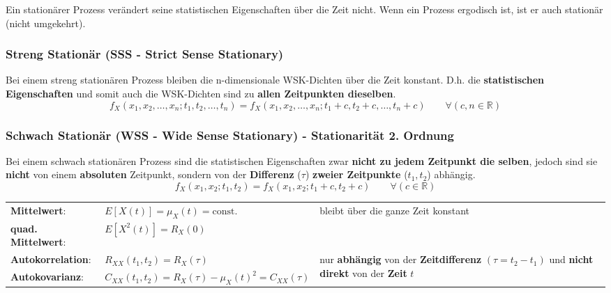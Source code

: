 Ein stationärer Prozess verändert seine statistischen Eigenschaften über die
Zeit nicht. Wenn ein Prozess ergodisch ist, ist er auch stationär (nicht
umgekehrt).\\

\subsubsection{Streng Stationär (SSS - Strict Sense Stationary)}
Bei einem streng stationären Prozess bleiben die n-dimensionale WSK-Dichten über die
Zeit konstant. D.h. die \textbf{statistischen Eigenschaften} und somit auch die WSK-Dichten sind zu 
\textbf{allen Zeitpunkten dieselben}.
$$ f_X(x_1, x_2, \ldots, x_n; t_1, t_2, \ldots, t_n) =
		f_X(x_1, x_2, \ldots, x_n; t_1+c, t_2+c, \ldots, t_n+c) \qquad \forall (c,n \in
		\mathbb{R})$$

\subsubsection{Schwach Stationär (WSS - Wide Sense Stationary) - Stationarität 2. Ordnung}
Bei einem schwach stationären Prozess sind die statistischen Eigenschaften zwar
\textbf{nicht zu jedem Zeitpunkt die selben}, jedoch sind sie \textbf{nicht} von einem \textbf{absoluten} Zeitpunkt, sondern
von der \textbf{Differenz} ($\tau$) \textbf{zweier Zeitpunkte} ($t_1, t_2$) abhängig.  \\ 
$$ f_X(x_1, x_2; t_1, t_2) = f_X(x_1, x_2; t_1+c, t_2+c) \qquad \forall (c \in
		\mathbb{R})$$
\renewcommand{\arraystretch}{1.4}
\begin{tabular}[c]{ p{3.3cm}  p{6.5cm} p{8cm} }
	\textbf{Mittelwert}: 	&  $E[X(t)] = \mu_{X}(t) = \text{const.}$  
							& bleibt über die ganze Zeit konstant\\ 
	\textbf{quad. Mittelwert}: 	&  $E[X^{2}(t)] = R_{X}(0)$  \\ 
	\textbf{Autokorrelation}: 	& 	$R_{XX}(t_{1},t_{2}) = R_{X}(\tau)$
	& \multirow{2}{8cm}{nur \textbf{abhängig} von der \textbf{Zeitdifferenz} $(\tau = t_2 - t_1)$ und \textbf{nicht direkt} von
	 der \textbf{Zeit} $t$} \\
	 \textbf{Autokovarianz}:		& $ C_{XX}(t_{1},t_{2}) = R_{X}(\tau) - \mu_{X}(t)^{2} = C_{XX}(\tau)$ \\
\end{tabular}
\renewcommand{\arraystretch}{1}
 

